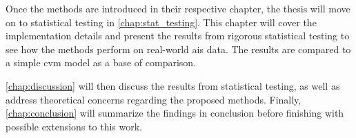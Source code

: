 Once the methods are introduced in their respective chapter, the thesis will move on to statistical testing in \cref{chap:stat_testing}. This chapter will cover the implementation details and present the results from rigorous statistical testing to see how the methods perform on real-world \acrshort{ais} data. The results are compared to a simple \acrshort{cvm} model as a base of comparison. 

\cref{chap:discussion} will then discuss the results from statistical testing, as well as address theoretical concerns regarding the proposed methods. 
Finally, \cref{chap:conclusion} will summarize the findings in conclusion before finishing with possible extensions to this work.



